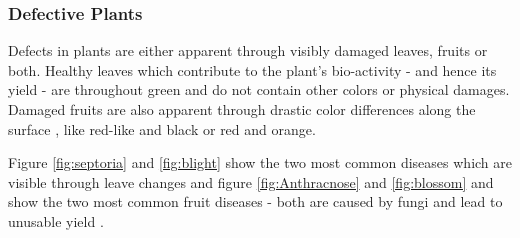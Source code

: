 \subsubsection*{Defective Plants}

Defects in plants are either apparent through visibly damaged leaves, fruits or both.
Healthy leaves which contribute to the plant's bio-activity - and hence its yield - are throughout green
and do not contain other colors or physical damages.
Damaged fruits are also apparent through drastic color differences along the surface ,
like red-like and black or red and orange.

Figure \ref{fig:septoria} and \ref{fig:blight} show the two most common diseases which are visible through leave changes and
figure \ref{fig:Anthracnose} and \ref{fig:blossom} and show the two most common fruit diseases - both are caused by fungi
and lead to unusable yield \cite{diseases}.

